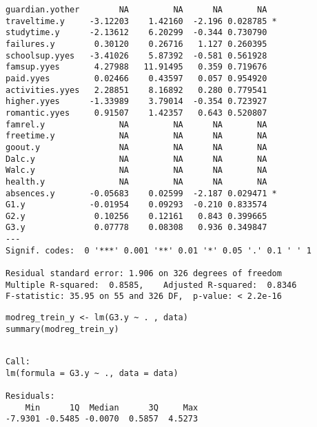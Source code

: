 \documentclass[11pt]{article}
\begin{document}
\begin{enumerate}
\begin{verbatim}
guardian.yother        NA         NA      NA       NA    
traveltime.y     -3.12203    1.42160  -2.196 0.028785 *  
studytime.y      -2.13612    6.20299  -0.344 0.730790    
failures.y        0.30120    0.26716   1.127 0.260395    
schoolsup.yyes   -3.41026    5.87392  -0.581 0.561928    
famsup.yyes       4.27988   11.91495   0.359 0.719676    
paid.yyes         0.02466    0.43597   0.057 0.954920    
activities.yyes   2.28851    8.16892   0.280 0.779541    
higher.yyes      -1.33989    3.79014  -0.354 0.723927    
romantic.yyes     0.91507    1.42357   0.643 0.520807    
famrel.y               NA         NA      NA       NA    
freetime.y             NA         NA      NA       NA    
goout.y                NA         NA      NA       NA    
Dalc.y                 NA         NA      NA       NA    
Walc.y                 NA         NA      NA       NA    
health.y               NA         NA      NA       NA    
absences.y       -0.05683    0.02599  -2.187 0.029471 *  
G1.y             -0.01954    0.09293  -0.210 0.833574    
G2.y              0.10256    0.12161   0.843 0.399665    
G3.y              0.07778    0.08308   0.936 0.349847    
---
Signif. codes:  0 '***' 0.001 '**' 0.01 '*' 0.05 '.' 0.1 ' ' 1

Residual standard error: 1.906 on 326 degrees of freedom
Multiple R-squared:  0.8585,	Adjusted R-squared:  0.8346 
F-statistic: 35.95 on 55 and 326 DF,  p-value: < 2.2e-16

\end{verbatim}

\begin{verbatim}
modreg_trein_y <- lm(G3.y ~ . , data)
summary(modreg_trein_y)
\end{verbatim}

\begin{verbatim}

Call:
lm(formula = G3.y ~ ., data = data)

Residuals:
    Min      1Q  Median      3Q     Max 
-7.9301 -0.5485 -0.0070  0.5857  4.5273 


\end{verbatim}
\end{enumerate}
\end{document}
